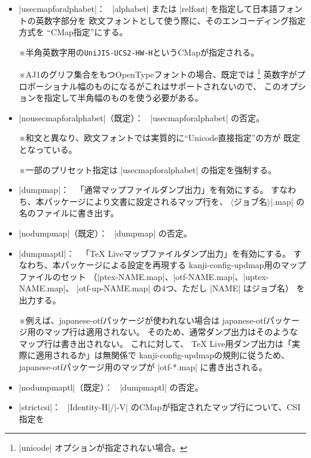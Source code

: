 \documentclass[uplatex,dvipdfmx,a4paper]{jsarticle}
\newcommand{\Pkg}[1]{\textsf{#1}}
\newcommand{\Meta}[1]{$\langle$\mbox{}#1\mbox{}$\rangle$}
\newcommand{\Note}{\par\noindent ※}
\newcommand{\Means}{：\ }
\begin{document}
\begin{itemize}
\item |usecmapforalphabet|\Means
  |alphabet| または |relfont| を指定して日本語フォントの英数字部分を
  欧文フォントとして使う際に、そのエンコーディング指定方式を
  “CMap指定”にする。
  \Note 半角英数字用の\texttt{UniJIS-UCS2-HW-H}というCMapが指定される。
  \Note AJ1のグリフ集合をもつOpenTypeフォントの場合、既定では
  \footnote{|unicode| オプションが指定されない場合。}%
  英数字がプロポーショナル幅のものになるがこれはサポートされないので、
  このオプションを指定して半角幅のものを使う必要がある。
\item |nousecmapforalphabet|（既定）\Means
  |usecmapforalphabet| の否定。
  \Note 和文と異なり、欧文フォントでは実質的に“Unicode直接指定”の方が
  既定となっている。
  \Note 一部のプリセット指定は |usecmapforalphabet| の指定を強制する。
\item |dumpmap|\Means
  「通常マップファイルダンプ出力」を有効にする。
  すなわち、本パッケージにより文書に設定されるマップ行を、
  \Meta{ジョブ名}|.map| の名のファイルに書き出す。
\item |nodumpmap|（既定）\Means
  |dumpmap| の否定。
\item |dumpmaptl|\Means
  「{\TeX} Liveマップファイルダンプ出力」を有効にする。
  すなわち、本パッケージによる設定を再現する
  kanji-config-updmap用のマップファイルのセット
  （|ptex-NAME.map|、|otf-NAME.map|、|uptex-NAME.map|、
  |otf-up-NAME.map| の4つ、ただし |NAME| はジョブ名）
  を出力する。
  \Note 例えば、\Pkg{japanese-otf}パッケージが使われない場合は
  \Pkg{japanese-otf}パッケージ用のマップ行は適用されない。
  そのため、通常ダンプ出力はそのようなマップ行は書き出されない。
  これに対して、
  {\TeX} Live用ダンプ出力は「実際に適用されるか」は無関係で
  kanji-config-updmapの規則に従うため、
  \Pkg{japanese-otf}パッケージ用のマップが |otf-*.map| に書き出される。
\item |nodumpmaptl|（既定）\Means
  |dumpmaptl| の否定。
\item |strictcsi|\Means
  |Identity-H|/|-V| のCMapが指定されたマップ行について、CSI指定を

\end{itemize}
\end{document}
